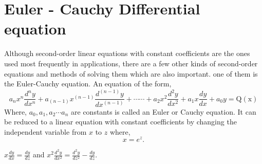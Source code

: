 \section{Euler - Cauchy Differential equation}
Although second-order linear equations with constant coefficients are the ones used most frequently in applications, there are a few other kinds of second-order equations and methods of solving them which are also important. one of them is the Euler-Cauchy equation. An equation of the form,
 \begin{equation}
a_{n} x^{n} \frac{d^{n} y}{d x^{n}}+a_{(n-1)} x^{(n-1)} \frac{d^{(n-1)} y}{d x^{(n-1)}}+\cdots \cdots+a_{2} x^{2} \frac{d^{2} y}{d x^{2}}+a_{1} x \frac{d y}{d x}+a_{0} y=\mathrm{Q(x)}
\end{equation}
Where, $a_{0},a_{1},a_{2}\cdots a_{n} $ are constants is called an Euler or Cauchy equation. It can be reduced to a linear equation with constant coefficients by changing the independent variable from $x$ to $z$ where,
$$
x=e^{z} .
$$

$x \frac{d y}{d x}=\frac{d y}{d z}$
and $x^{2} \frac{d^{2} y}{d x^{2}}=\frac{d^{2} y}{d z^{2}}-\frac{d y}{d z}$.


